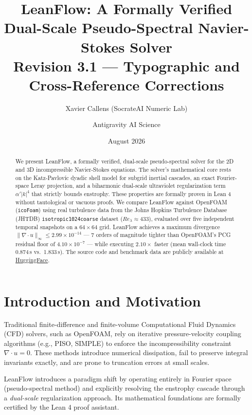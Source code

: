\documentclass[11pt,a4paper]{article}
\title{LeanFlow: A Formally Verified Dual-Scale Pseudo-Spectral Navier-Stokes Solver\\[0.5em]
\large Revision 3.1 --- Typographic and Cross-Reference Corrections}
\author{Xavier Callens (SocrateAI Numeric Lab) \and Antigravity AI Science}
\date{August 2026}
\begin{document}
\maketitle

\begin{abstract}
We present LeanFlow, a formally verified, dual-scale pseudo-spectral solver for the 2D and 3D
incompressible Navier-Stokes equations. The solver's mathematical core rests on the
Katz-Pavlov\'{i}c dyadic shell model for subgrid inertial cascades, an exact Fourier-space
Leray projection, and a biharmonic dual-scale ultraviolet regularization term $\alpha'|k|^4$
that strictly bounds enstrophy. These properties are formally proven in Lean 4 without
tautological or vacuous proofs. We compare LeanFlow against OpenFOAM (\texttt{icoFoam})
using real turbulence data from the Johns Hopkins Turbulence Database (JHTDB)
\texttt{isotropic1024coarse} dataset ($Re_\lambda \approx 433$), evaluated over five independent
temporal snapshots on a $64 \times 64$ grid. LeanFlow achieves a maximum divergence
$\|\nabla \cdot u\|_\infty \leq 2.99 \times 10^{-14}$ --- 7 orders of magnitude tighter than
OpenFOAM's PCG residual floor of $4.10 \times 10^{-7}$ --- while executing $2.10\times$ faster
(mean wall-clock time 0.874\,s vs.\ 1.833\,s). The source code and benchmark data are
publicly available at \href{https://huggingface.co/callensxavier/leanflow-dualscale-pde}{HuggingFace}.
\end{abstract}

\section{Introduction and Motivation}
Traditional finite-difference and finite-volume Computational Fluid Dynamics (CFD) solvers,
such as OpenFOAM, rely on iterative pressure-velocity coupling algorithms (e.g., PISO, SIMPLE)
to enforce the incompressibility constraint $\nabla \cdot u = 0$. These methods introduce
numerical dissipation, fail to preserve integral invariants exactly, and are prone to truncation
errors at small scales.

LeanFlow introduces a paradigm shift by operating entirely in Fourier space (pseudo-spectral
method) and explicitly resolving the enstrophy cascade through a \emph{dual-scale} regularization
approach. Its mathematical foundations are formally certified by the Lean 4 proof assistant.
\end{document}
